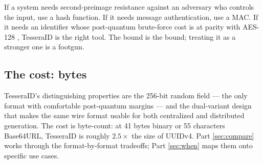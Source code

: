 If a system needs second-preimage resistance against an adversary who controls the input, use a hash function. If it needs message authentication, use a MAC. If it needs an identifier whose post-quantum brute-force cost is at parity with AES-128 \citep{fips197}, TesseraID is the right tool. The bound is the bound; treating it as a stronger one is a footgun.

\subsection{The cost: bytes}

TesseraID's distinguishing properties are the 256-bit random field --- the only format with comfortable post-quantum margins --- and the dual-variant design that makes the same wire format usable for both centralized and distributed generation. The cost is byte-count: at 41 bytes binary or 55 characters Base64URL, TesseraID is roughly $2.5\times$ the size of UUIDv4. Part \ref{sec:compare} works through the format-by-format tradeoffs; Part \ref{sec:when} maps them onto specific use cases.

